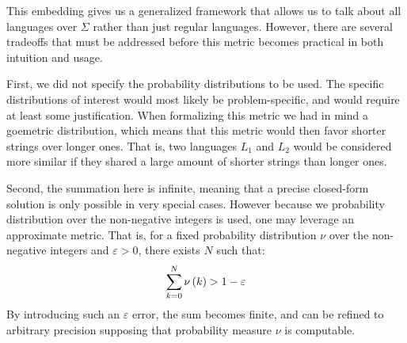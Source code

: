 This embedding gives us a generalized framework that allows us to talk
about all languages over \(\Sigma\) rather than just regular languages.
However, there are several tradeoffs that must be addressed before
this metric becomes practical in both intuition and usage.

First, we did not specify the probability distributions to be used.
The specific distributions of interest would most likely be
problem-specific, and would require at least some justification.
When formalizing this metric we had in mind a goemetric distribution,
which means that this metric would then favor shorter strings over longer ones.
That is, two languages \(L_1\) and \(L_2\) would be considered more similar
if they shared a large amount of shorter strings than longer ones.

Second, the summation here is infinite, meaning that a precise closed-form
solution is only possible in very special cases.
However because we probability distribution over the non-negative integers
is used, one may leverage an approximate metric.
That is, for a fixed probability distribution \(\nu\)
over the non-negative integers
and \(\varepsilon > 0\),
there exists \(N\) such that:
\begin{align*}
  \sum_{k = 0}^{N} \nu\left(k\right) > 1 - \varepsilon
\end{align*}
By introducing such an \(\varepsilon\) error,
the sum becomes finite,
and can be refined to arbitrary precision supposing that
probability measure
\(\nu\) is computable.



